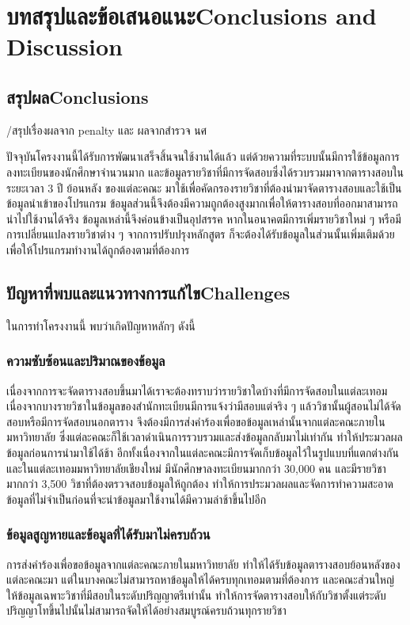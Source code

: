 \chapter{\ifcpe บทสรุปและข้อเสนอแนะ\else Conclusions and Discussion\fi}

\section{\ifcpe สรุปผล\else Conclusions\fi}

/สรุปเรื่องผลจาก penalty และ ผลจากสำรวจ นศ

ปัจจุบันโครงงานนี้ได้รับการพัฒนาเสร็จสิ้นจนใช้งานได้แล้ว แต่ด้วยความที่ระบบนั้นมีการใช้ข้อมูลการลงทะเบียนของนักศึกษาจำนวนมาก 
และข้อมูลรายวิชาที่มีการจัดสอบซึ่งได้รวบรวมมาจากตารางสอบในระยะเวลา 3 ปี ย้อนหลัง ของแต่ละคณะ 
มาใช้เพื่อคัดกรองรายวิชาที่ต้องนำมาจัดตารางสอบและใช้เป็นข้อมูลนำเข้าของโปรแกรม ข้อมูลส่วนนี้จึงต้องมีความถูกต้องสูงมากเพื่อให้ตารางสอบที่ออกมาสามารถนำไปใช้งานได้จริง
ข้อมูลเหล่านี้จึงค่อนข้างเป็นอุปสรรค หากในอนาคตมีการเพิ่มรายวิชาใหม่ ๆ หรือมีการเปลี่ยนแปลงรายวิชาต่าง ๆ จากการปรับปรุงหลักสูตร ก็จะต้องได้รับข้อมูลในส่วนนั้นเพิ่มเติมด้วย เพื่อให้โปรแกรมทำงานได้ถูกต้องตามที่ต้องการ

\section{\ifcpe ปัญหาที่พบและแนวทางการแก้ไข\else Challenges\fi}

ในการทำโครงงานนี้ พบว่าเกิดปัญหาหลักๆ ดังนี้
\subsection{ความซับซ้อนและปริมาณของข้อมูล}
เนื่องจากการจะจัดตารางสอบขึ้นมาได้เราจะต้องทราบว่ารายวิชาใดบ้างที่มีการจัดสอบในแต่ละเทอม เนื่องจากบางรายวิชาในข้อมูลของสำนักทะเบียนมีการแจ้งว่ามีสอบแต่จริง ๆ แล้ววิชานั้นผู้สอนไม่ได้จัดสอบหรือมีการจัดสอบนอกตาราง
จึงต้องมีการส่งคำร้องเพื่อขอข้อมูลเหล่านั้นจากแต่ละคณะภายในมหาวิทยาลัย ซึ่งแต่ละคณะก็ใช้เวลาดำเนินการรวบรวมและส่งข้อมูลกลับมาไม่เท่ากัน
ทำให้ประมวลผลข้อมูลก่อนการนำมาใช้ได้ช้า อีกทั้งเนื่องจากในแต่ละคณะมีการจัดเก็บข้อมูลไว้ในรูปแบบที่แตกต่างกัน และในแต่ละเทอมมหาวิทยาลัยเชียงใหม่ 
มีนักศึกษาลงทะเบียนมากกว่า 30,000 คน และมีรายวิชามากกว่า 3,500 วิชาที่ต้องตรวจสอบข้อมูลให้ถูกต้อง
ทำให้การประมวลผลและจัดการทำความสะอาดข้อมูลที่ไม่จำเป็นก่อนที่จะนำข้อมูลมาใช้งานได้มีความล่าช้าขึ้นไปอีก
\subsection{ข้อมูลสูญหายและข้อมูลที่ได้รับมาไม่ครบถ้วน}
การส่งคำร้องเพื่อขอข้อมูลจากแต่ละคณะภายในมหาวิทยาลัย ทำให้ได้รับข้อมูลตารางสอบย้อนหลังของแต่ละคณะมา แต่ในบางคณะไม่สามารถหาข้อมูลให้ได้ครบทุกเทอมตามที่ต้องการ และคณะส่วนใหญ่ให้ข้อมูลเฉพาะวิชาที่มีสอบในระดับปริญญาตรีเท่านั้น
ทำให้การจัดตารางสอบให้กับวิชาตั้งแต่ระดับปริญญาโทขึ้นไปนั้นไม่สามารถจัดให้ได้อย่างสมบูรณ์ครบถ้วนทุกรายวิชา


